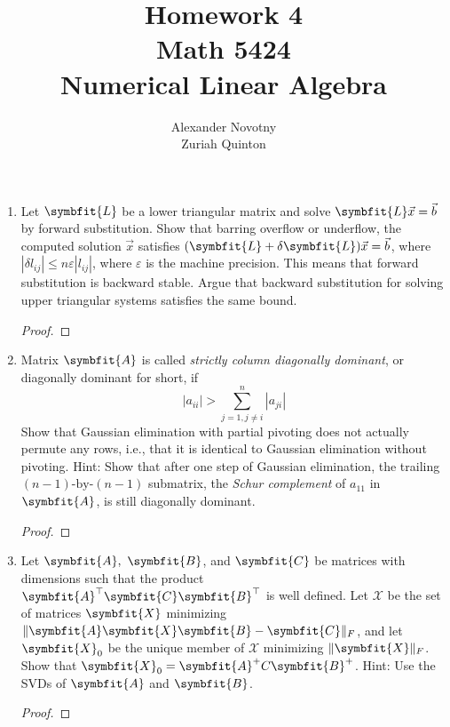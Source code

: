 \documentclass{article}
\title{Homework 4\\{\large Math 5424}\\{\large Numerical Linear Algebra}}
\author{Alexander Novotny\\Zuriah Quinton}
\theoremstyle{definition}
\newcommand{\mat}[1]{\symbfit{#1}}
\begin{document}
\maketitle

\begin{enumerate}[leftmargin=\labelsep]
	\item Let \(\mat{L}\) be a lower triangular matrix and solve \(\mat{L}\vec{x} = \vec{b}\) by forward substitution. Show that barring overflow or underflow, the computed solution \(\vec{x}\) satisfies \((\mat{L} + \delta\mat{L})\vec{x} = \vec{b}\), where \(|\delta l_{ij}| \leq n\varepsilon|l_{ij}|\), where \(\varepsilon\) is the machine precision. This means that forward substitution is backward stable. Argue that backward substitution for solving upper triangular systems satisfies the same bound.
	      \begin{proof}

	      \end{proof}

	\item Matrix \(\mat{A}\) is called \emph{strictly column diagonally dominant}, or diagonally dominant for short, if
	      \[
		      |a_{ii}| > \sum_{j=1, j \neq i}^{n} |a_{ji}|
	      \]
	      Show that Gaussian elimination with partial pivoting does not actually permute any rows, i.e., that it is identical to Gaussian elimination without pivoting. Hint: Show that after one step of Gaussian elimination, the trailing \((n - 1)\text{-by-}(n - 1)\) submatrix, the \emph{Schur complement} of \(a_{11}\) in \(\mat{A}\), is still diagonally dominant.
	      \begin{proof}

	      \end{proof}

	\item Let \(\mat{A},\ \mat{B}\), and \(\mat{C}\) be matrices with dimensions such that the product \(\mat{A}^\top\mat{C}\mat{B}^\top\) is well defined. Let \(\mathcal{X}\) be the set of matrices \(\mat{X}\) minimizing \(\|\mat{A}\mat{X} \mat{B} - \mat{C}\|_F\), and let \(\mat{X}_0\) be the unique member of \(\mathcal{X}\) minimizing \(\|\mat{X}\|_F\). Show that \(\mat{X}_0 = \mat{A}^+C\mat{B}^+\). Hint: Use the SVDs of \(\mat{A}\) and \(\mat{B}\).
	      \begin{proof}

	      \end{proof}


\end{enumerate}
\end{document}
